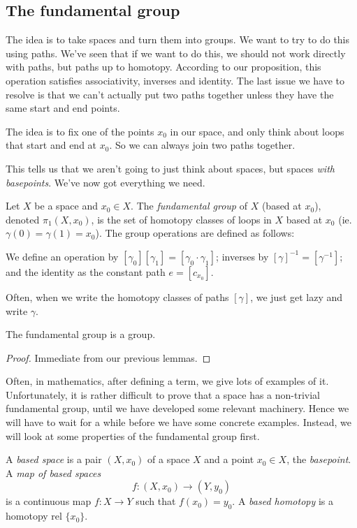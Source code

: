 \documentclass[a4paper]{article}
\begin{document}
\subsection{The fundamental group}
The idea is to take spaces and turn them into groups. We want to try to do this using paths. We've seen that if we want to do this, we should not work directly with paths, but paths up to homotopy. According to our proposition, this operation satisfies associativity, inverses and identity. The last issue we have to resolve is that we can't actually put two paths together unless they have the same start and end points.

The idea is to fix one of the points $x_0$ in our space, and only think about loops that start and end at $x_0$. So we can always join two paths together.

This tells us that we aren't going to just think about spaces, but spaces \emph{with basepoints}. We've now got everything we need.

\begin{defi}
  Let $X$ be a space and $x_0 \in X$. The \emph{fundamental group} of $X$ (based at $x_0$), denoted $\pi_1(X, x_0)$, is the set of homotopy classes of loops in $X$ based at $x_0$ (ie. $\gamma(0) = \gamma(1) = x_0$). The group operations are defined as follows:

  We define an operation by $[\gamma_0][\gamma_1] = [\gamma_0\cdot \gamma_1]$; inverses by $[\gamma]^{-1} = [\gamma^{-1}]$; and the identity as the constant path $e = [c_{x_0}]$.
\end{defi}
Often, when we write the homotopy classes of paths $[\gamma]$, we just get lazy and write $\gamma$.

\begin{thm}
  The fundamental group is a group.
\end{thm}

\begin{proof}
  Immediate from our previous lemmas.
\end{proof}

Often, in mathematics, after defining a term, we give lots of examples of it. Unfortunately, it is rather difficult to prove that a space has a non-trivial fundamental group, until we have developed some relevant machinery. Hence we will have to wait for a while before we have some concrete examples. Instead, we will look at some properties of the fundamental group first.

\begin{defi}
  A \emph{based space} is a pair $(X, x_0)$ of a space $X$ and a point $x_0\in X$, the \emph{basepoint}. A \emph{map of based spaces}
  \[
    f: (X, x_0) \to (Y, y_0)
  \]
  is a continuous map $f: X\to Y$ such that $f(x_0) = y_0$. A \emph{based homotopy} is a homotopy rel $\{x_0\}$.
\end{defi}
\end{document}
